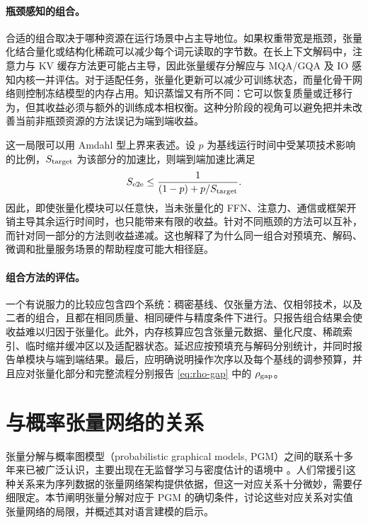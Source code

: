 \documentclass[11pt]{article}
\begin{document}
\paragraph{瓶颈感知的组合。}
合适的组合取决于哪种资源在运行场景中占主导地位。如果权重带宽是瓶颈，张量化结合量化或结构化稀疏可以减少每个词元读取的字节数。在长上下文解码中，注意力与 KV 缓存方法更可能占主导，因此张量缓存分解应与 MQA/GQA 及 IO 感知内核一并评估。对于适配任务，张量化更新可以减少可训练状态，而量化骨干网络则控制冻结模型的内存占用。知识蒸馏又有所不同：它可以恢复质量或迁移行为，但其收益必须与额外的训练成本相权衡。这种分阶段的视角可以避免把并未改善当前非瓶颈资源的方法误记为端到端收益。

这一局限可以用 Amdahl 型上界来表述。设 $p$ 为基线运行时间中受某项技术影响的比例，$S_{\rm target}$ 为该部分的加速比，则端到端加速比满足
\begin{equation}
S_{\rm e2e} \leq \frac{1}{(1-p)+p/S_{\rm target}}.
\label{eq:neighboring-amdahl}
\end{equation}
因此，即使张量化模块可以任意快，当未张量化的 FFN、注意力、通信或框架开销主导其余运行时间时，也只能带来有限的收益。针对不同瓶颈的方法可以互补，而针对同一部分的方法则收益递减。这也解释了为什么同一组合对预填充、解码、微调和批量服务场景的帮助程度可能大相径庭。

\paragraph{组合方法的评估。}
一个有说服力的比较应包含四个系统：稠密基线、仅张量方法、仅相邻技术，以及二者的组合，且都在相同质量、相同硬件与精度条件下进行。只报告组合结果会使收益难以归因于张量化。此外，内存核算应包含张量元数据、量化尺度、稀疏索引、临时缩并缓冲区以及适配器状态。延迟应按预填充与解码分别统计，并同时报告单模块与端到端结果。最后，应明确说明操作次序以及每个基线的调参预算，并且应对张量化部分和完整流程分别报告 \cref{eq:rho-gap} 中的 $\rho_{\rm gap}$。

\section{与概率张量网络的关系}
\label{sec:prob-tensor-nets}
张量分解与概率图模型（probabilistic graphical models, PGM）之间的联系十多年来已被广泛认识，主要出现在无监督学习与密度估计的语境中 \cite{hameed2025efficient,han2018unsupervised,miller2021tensor,vieijra2022generative,glasser2019expressive}。人们常援引这种关系来为序列数据的张量网络架构提供依据，但这一对应关系十分微妙，需要仔细限定。本节阐明张量分解对应于 PGM 的确切条件，讨论这些对应关系对实值张量网络的局限，并概述其对语言建模的启示。
\end{document}
